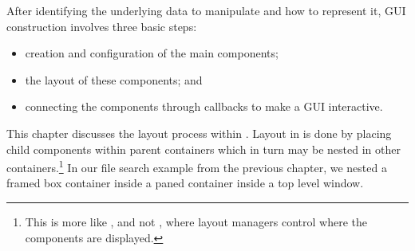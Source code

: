 


After identifying the underlying data to manipulate and how to
represent it, GUI construction involves three basic steps:

\begin{itemize}
\item creation and configuration of the main components;
\item the layout of these components; and
\item connecting the components through callbacks to make a GUI interactive.
\end{itemize}

This chapter discusses the layout process within
. Layout in  is done by placing child
components within parent containers which in turn may be nested in
other containers.\footnote{This is more like \GTK, and not \Qt, where
  layout managers control where the components are displayed.} In our
file search example from the previous chapter, we nested a framed box
container inside a paned container inside a top level window.  

